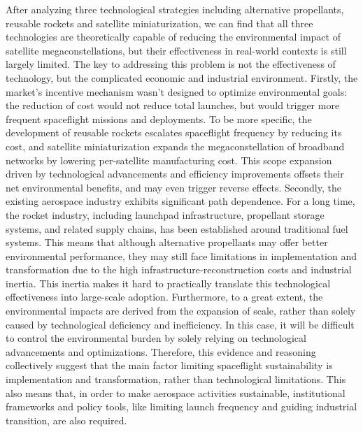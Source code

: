 \documentclass[12pt]{article}
\begin{document}
After analyzing three technological strategies including alternative propellants, reusable rockets and satellite miniaturization, we can find that all three technologies are theoretically capable of reducing the environmental impact of satellite megaconstellations, but their effectiveness in real-world contexts is still largely limited. The key to addressing this problem is not the effectiveness of technology, but the complicated economic and industrial environment. Firstly, the market's incentive mechanism wasn't designed to optimize environmental goals: the reduction of cost would not reduce total launches, but would trigger more frequent spaceflight missions and deployments. To be more specific, the development of reusable rockets escalates spaceflight frequency by reducing its cost, and satellite miniaturization expands the megaconstellation of broadband networks by lowering per-satellite manufacturing cost. This scope expansion driven by technological advancements and efficiency improvements offsets their net environmental benefits, and may even trigger reverse effects. Secondly, the existing aerospace industry exhibits significant path dependence. For a long time, the rocket industry, including launchpad infrastructure, propellant storage systems, and related supply chains, has been established around traditional fuel systems. This means that although alternative propellants may offer better environmental performance, they may still face limitations in implementation and transformation due to the high infrastructure-reconstruction costs and industrial inertia. This inertia makes it hard to practically translate this technological effectiveness into large-scale adoption. Furthermore, to a great extent, the environmental impacts are derived from the expansion of scale, rather than solely caused by technological deficiency and inefficiency. In this case, it will be difficult to control the environmental burden by solely relying on technological advancements and optimizations. Therefore, this evidence and reasoning collectively suggest that the main factor limiting spaceflight sustainability is implementation and transformation, rather than technological limitations. This also means that, in order to make aerospace activities sustainable, institutional frameworks and policy tools, like limiting launch frequency and guiding industrial transition, are also required.
\end{document}
